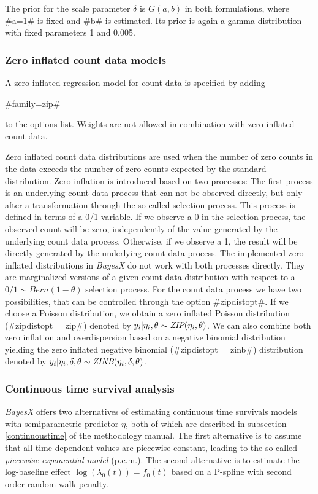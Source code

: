 The prior for the scale parameter $\delta$ is $G(a,b)$ in both
formulations, where #a=1# is fixed and #b# is estimated. Its prior
is again a gamma distribution with fixed parameters 1 and 0.005.

\subsubsection*{Zero inflated count data models}

A zero inflated regression model for count data is specified by
adding

#family=zip#

to the options list. Weights are not allowed in combination with
zero-inflated count data.

Zero inflated count data distributions are used when the number of
zero counts in the data exceeds the number of zero counts expected
by the standard distribution. Zero inflation is introduced based
on two processes: The first process is an underlying count data
process that can not be observed directly, but only after a
transformation through the so called selection process. This
process is defined in terms of a 0/1 variable. If we observe a 0
in the selection process, the observed count will be zero,
independently of the value generated by the underlying count data
process. Otherwise, if we observe a 1, the result will be directly
generated by the underlying count data process. The implemented
zero inflated distributions in {\em BayesX} do not work with both
processes directly. They are marginalized versions of a given
count data distribution with respect to a $0/1 \sim
Bern(1-\theta)$ selection process. For the count data process we
have two possibilities, that can be controlled through the option
#zipdistopt#. If we choose a Poisson distribution, we obtain a
zero inflated Poisson distribution (#zipdistopt = zip#) denoted by
$y_i | \eta_i,\theta \sim \mbox{\it ZIP}(\eta_i,\theta)$. We can
also combine both zero inflation and overdispersion based on a
negative binomial distribution yielding the zero inflated negative
binomial (#zipdistopt = zinb#) distribution denoted by $y_i |
\eta_i,\delta, \theta \sim \mbox{\it ZINB}(\eta_i,\delta,\theta)$.


\subsubsection{Continuous time survival analysis}
\label{cont_survivalAnalysis}

\textit{BayesX} offers two alternatives of estimating continuous
time survivals models with semiparametric predictor $\eta$, both
of which are described in subsection \ref*{continuoustime} of the
methodology manual. The first alternative is to assume that all
time-dependent values are piecewise constant, leading to the so
called \textit{piecewise exponential model} (p.e.m.). The second
alternative is to estimate the log-baseline effect
$\log(\lambda_0(t))=f_0(t)$ based on a P-spline with second order
random walk penalty.


